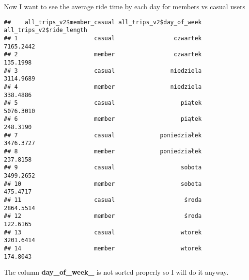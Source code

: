 \documentclass[
]{article}
\newenvironment{Shaded}{\begin{snugshade}}{\end{snugshade}}
\newcommand{\AttributeTok}[1]{\textcolor[rgb]{0.13,0.29,0.53}{#1}}
\newcommand{\FunctionTok}[1]{\textcolor[rgb]{0.13,0.29,0.53}{\textbf{#1}}}
\newcommand{\NormalTok}[1]{#1}
\newcommand{\OtherTok}[1]{\textcolor[rgb]{0.56,0.35,0.01}{#1}}
\newcommand{\SpecialCharTok}[1]{\textcolor[rgb]{0.81,0.36,0.00}{\textbf{#1}}}
\newcommand{\StringTok}[1]{\textcolor[rgb]{0.31,0.60,0.02}{#1}}
\begin{document}
Now I want to see the average ride time by each day for members vs
casual users

\begin{Shaded}
\end{Shaded}

\begin{verbatim}
##    all_trips_v2$member_casual all_trips_v2$day_of_week all_trips_v2$ride_length
## 1                      casual                 czwartek                7165.2442
## 2                      member                 czwartek                 135.1998
## 3                      casual                niedziela                3114.9689
## 4                      member                niedziela                 338.4886
## 5                      casual                   piątek                5076.3010
## 6                      member                   piątek                 248.3190
## 7                      casual             poniedziałek                3476.3727
## 8                      member             poniedziałek                 237.8158
## 9                      casual                   sobota                3499.2652
## 10                     member                   sobota                 475.4717
## 11                     casual                    środa                2864.5514
## 12                     member                    środa                 122.6165
## 13                     casual                   wtorek                3201.6414
## 14                     member                   wtorek                 174.8043
\end{verbatim}

The column \textbf{day\_of\_week\_} is not sorted properly so I will do
it anyway.

\begin{Shaded}
\end{Shaded}
\end{document}
